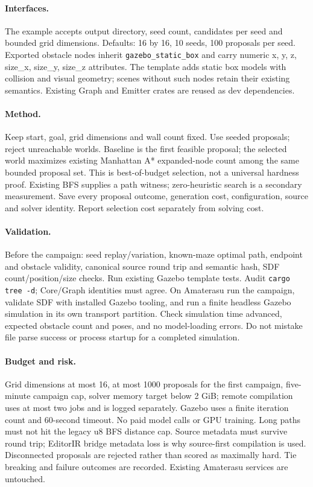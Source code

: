 \documentclass[11pt,a4paper]{article}
\begin{document}
\paragraph{Interfaces.} The example accepts output directory, seed count, candidates
per seed and bounded grid dimensions. Defaults: 16 by 16, 10 seeds, 100 proposals
per seed. Exported obstacle nodes inherit \texttt{gazebo\_static\_box} and carry
numeric x, y, z, size\_x, size\_y, size\_z attributes. The template adds static box
models with collision and visual geometry; scenes without such nodes retain their
existing semantics. Existing Graph and Emitter crates are reused as dev dependencies.
\paragraph{Method.} Keep start, goal, grid dimensions and wall count fixed. Use seeded
proposals; reject unreachable worlds. Baseline is the first feasible proposal;
the selected world maximizes existing Manhattan A* expanded-node count among the
same bounded proposal set. This is best-of-budget selection, not a universal
hardness proof. Existing BFS supplies a path witness; zero-heuristic search is a
secondary measurement. Save every proposal outcome, generation cost, configuration,
source and solver identity. Report selection cost separately from solving cost.
\paragraph{Validation.} Before the campaign: seed replay/variation, known-maze optimal
path, endpoint and obstacle validity, canonical source round trip and semantic hash,
SDF count/position/size checks. Run existing Gazebo template tests. Audit
\texttt{cargo tree -d}; Core/Graph identities must agree. On Amaterasu run the
campaign, validate SDF with installed Gazebo tooling, and run a finite headless
Gazebo simulation in its own transport partition. Check simulation time advanced,
expected obstacle count and poses, and no model-loading errors. Do not mistake
file parse success or process startup for a completed simulation.
\paragraph{Budget and risk.} Grid dimensions at most 16, at most 1000 proposals for
the first campaign, five-minute campaign cap, solver memory target below 2 GiB;
remote compilation uses at most two jobs and is logged separately. Gazebo uses a
finite iteration count and 60-second timeout. No paid model calls or GPU training.
Long paths must not hit the legacy u8 BFS distance cap. Source metadata must survive
round trip; EditorIR bridge metadata loss is why source-first compilation is used.
Disconnected proposals are rejected rather than scored as maximally hard. Tie
breaking and failure outcomes are recorded. Existing Amaterasu services are untouched.
\end{document}
